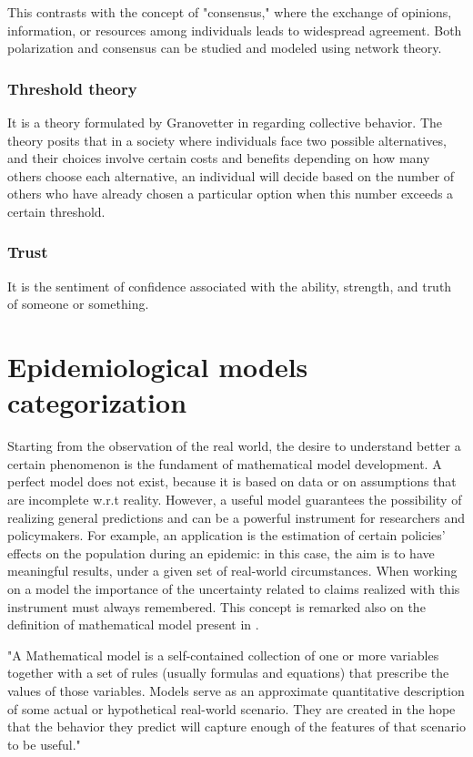 This contrasts with the concept of "consensus," where the exchange of opinions, information, or resources among individuals leads to widespread agreement. Both polarization and consensus can be studied and modeled using network theory.
\subsubsection{Threshold theory}
It is a theory formulated by Granovetter in \cite{Granovetter_1978} regarding collective behavior. The theory posits that in a society where individuals face two possible alternatives, and their choices involve certain costs and benefits depending on how many others choose each alternative, an individual will decide based on the number of others who have already chosen a particular option when this number exceeds a certain threshold.

\subsubsection{Trust} It is the sentiment of confidence associated with the ability, strength, and truth of someone or something. 

\section{Epidemiological models categorization}
\label{sec:models_categ}
Starting from the observation of the real world, the desire to understand better a certain phenomenon is the fundament of mathematical model development. A perfect model does not exist, because it is based on data or on assumptions that are incomplete w.r.t reality. However, a useful model guarantees the possibility of realizing general predictions and can be a powerful instrument for researchers and policymakers.  For example, an application is the estimation of certain policies' effects on the population during an epidemic: in this case, the aim is to have meaningful results, under a given set of real-world circumstances.
When working on a model the importance of the uncertainty related to claims realized with this instrument must always remembered. This concept is remarked also on the definition of mathematical model present in \cite{Ledder_2023}. 
\begin{displayquote}
	"A Mathematical model is a self-contained collection of one or more variables together with a set of rules (usually formulas and equations) that prescribe the values of those variables. Models serve as an approximate quantitative description of some actual or hypothetical real-world scenario. They are created in the hope that the behavior they predict will capture enough of the features of that scenario to be useful."
\end{displayquote}

